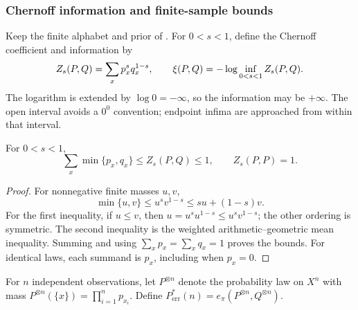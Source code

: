 \subsubsection{Chernoff information and finite-sample bounds}
\label{sec:chernoff-bounds}

Keep the finite alphabet and prior of .
For $0<s<1$, define the Chernoff coefficient and information by
\begin{equation}
 Z_s(P,Q)=\sum_x p_x^s q_x^{1-s},\qquad
 \xi(P,Q)=-\log\inf_{0<s<1}Z_s(P,Q).
 \label{eq:chernoff-info}
\end{equation}
The logarithm is extended by $\log0=-\infty$, so the information
may be $+\infty$. The open interval avoids a $0^0$ convention;
endpoint infima are approached from within that interval.

\begin{lemma}
\label{lem:chernoff-coefficient}
For $0<s<1$,
\[
 \sum_x\min\{p_x,q_x\}\le Z_s(P,Q)\le1,
 \qquad Z_s(P,P)=1.
\]
\end{lemma}
\begin{proof}
For nonnegative finite masses $u,v$,
\[
 \min\{u,v\}\le u^s v^{1-s}\le su+(1-s)v.
\]
For the first inequality, if $u\le v$, then
$u=u^su^{1-s}\le u^sv^{1-s}$; the other ordering is symmetric.
The second inequality is the weighted arithmetic--geometric mean
inequality. Summing and using $\sum_xp_x=\sum_xq_x=1$ proves the
bounds. For identical laws, each summand is $p_x$, including when
$p_x=0$.
\end{proof}

For $n$ independent observations, let $P^{\otimes n}$ denote the
probability law on $X^n$ with mass
$P^{\otimes n}(\{x\})=\prod_{i=1}^n p_{x_i}$. Define
$P_{\mathrm{err}}^*(n)=e_\pi(P^{\otimes n},Q^{\otimes n})$.

